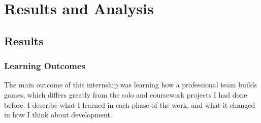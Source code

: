 \chapter{Results and Analysis}

\section{Results}

\subsection{Learning Outcomes}
The main outcome of this internship was learning how a professional team builds games, which differs greatly from the solo and coursework projects I had done before. I describe what I learned in each phase of the work, and what it changed in how I think about development.

